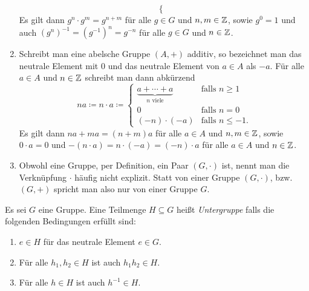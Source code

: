 \begin{bem}
\begin{enumerate}[leftmargin=*]
\[\begin{cases}
    \end{cases}
   \]
   Es gilt dann $g^n \cdot g^m = g^{n+m}$ für alle $g \in G$ und $n,m \in \mathbb{Z}$, sowie $g^0 = 1$ und auch  $(g^n)^{-1} = (g^{-1})^n = g^{-n}$ für alle $g \in G$ und $n \in \mathbb{Z}$.
  \item
   Schreibt man eine abelsche Gruppe $(A,+)$ additiv, so bezeichnet man das neutrale Element mit $0$ und das neutrale Element von $a \in A$ als $-a$. Für alle $a \in A$ und $n \in \mathbb{Z}$ schreibt man dann abkürzend
   \[
    n a \coloneqq
    n \cdot a \coloneqq
    \begin{cases}
     \underbrace{a + \dotsb + a}_{\text{$n$ viele}} & \text{falls $n \geq 1$} \\
     0                                              & \text{falls $n = 0$} \\
     (-n) \cdot (-a)                                & \text{falls $n \leq -1$}.
    \end{cases}
   \]
   Es gilt dann $na + ma = (n+m)a$ für alle $a \in A$ und $n,m \in \mathbb{Z}$, sowie $0 \cdot a = 0$ und $-(n \cdot a) = n \cdot (-a) = (-n) \cdot a$ für alle $a \in A$ und $n \in \mathbb{Z}$.
  \item
   Obwohl eine Gruppe, per Definition, ein Paar $(G, \cdot)$ ist, nennt man die Verknüpfung $\cdot$ häufig nicht explizit. Statt von einer Gruppe $(G, \cdot)$, bzw.\ $(G, +)$ spricht man also nur von einer Gruppe $G$.
 \end{enumerate}
\end{bem}


\begin{defi}
 Es sei $G$ eine Gruppe. Eine Teilmenge $H \subseteq G$ heißt \emph{Untergruppe} falls die folgenden Bedingungen erfüllt sind:
 \begin{enumerate}[label=\roman*)]
  \item
   $e \in H$ für das neutrale Element $e \in G$.
  \item
   Für alle $h_1, h_2 \in H$ ist auch $h_1 h_2 \in H$.
  \item
   Für alle $h \in H$ ist auch $h^{-1} \in H$.
 \end{enumerate}
\end{defi}


